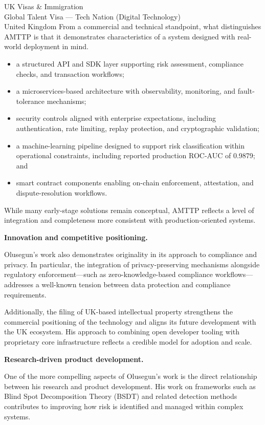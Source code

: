 \documentclass[12pt,a4paper]{letter}
\begin{document}
\begin{letter}{UK Visas \& Immigration\\
Global Talent Visa --- Tech Nation (Digital Technology)\\
United Kingdom}
From a commercial and technical standpoint, what distinguishes AMTTP is
that it demonstrates characteristics of a system designed with real-world
deployment in mind.

\begin{itemize}[nosep,leftmargin=*]
  \item a structured API and SDK layer supporting risk assessment,
    compliance checks, and transaction workflows;
  \item a microservices-based architecture with observability,
    monitoring, and fault-tolerance mechanisms;
  \item security controls aligned with enterprise expectations,
    including authentication, rate limiting, replay protection, and
    cryptographic validation;
  \item a machine-learning pipeline designed to support risk
    classification within operational constraints, including reported
    production ROC-AUC of 0.9879; and
  \item smart contract components enabling on-chain enforcement,
    attestation, and dispute-resolution workflows.
\end{itemize}

While many early-stage solutions remain conceptual, AMTTP reflects a
level of integration and completeness more consistent with
production-oriented systems.


\textbf{Innovation and competitive positioning.}

Olusegun's work also demonstrates originality in its approach to
compliance and privacy.  In particular, the integration of
privacy-preserving mechanisms alongside regulatory enforcement---such as
zero-knowledge-based compliance workflows---addresses a well-known
tension between data protection and compliance requirements.

Additionally, the filing of UK-based intellectual property strengthens
the commercial positioning of the technology and aligns its future
development with the UK ecosystem.  His approach to combining open
developer tooling with proprietary core infrastructure reflects a
credible model for adoption and scale.


\textbf{Research-driven product development.}

One of the more compelling aspects of Olusegun's work is the direct
relationship between his research and product development.  His work on
frameworks such as Blind Spot Decomposition Theory (BSDT) and related
detection methods contributes to improving how risk is identified and
managed within complex systems.


\end{letter}
\end{document}
